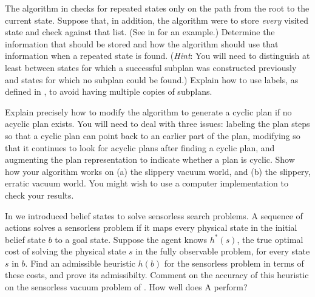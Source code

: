 
\begin{exercise}
The  algorithm in
 checks for repeated states only
on the path from the root to the current state.
Suppose that, in addition, the algorithm were to store {\em every}
visited state and check against that list. (See  in
 for an example.) Determine the
information that should be stored and how the algorithm should use
that information when a repeated state is found. ({\em Hint}: You will
need to distinguish at least between states for which a successful
subplan was constructed previously and states for which no subplan
could be found.) Explain how to use labels, as defined in , to avoid having multiple copies of subplans.
\end{exercise} 

\begin{exercise}\prgex
Explain precisely how to modify the  algorithm
to generate a cyclic plan if no acyclic plan exists. You will need to deal
with three issues: labeling the plan steps so that a cyclic
plan can point back to an earlier part of the plan, modifying
 so that it continues to look for acyclic plans after
finding a cyclic plan, and augmenting the plan representation to
indicate whether  a plan is cyclic. Show how your algorithm
works on (a) the slippery vacuum world, and (b) 
the slippery, erratic vacuum world. You might wish to use a
computer implementation to check your results.
\end{exercise} 



\begin{exercise}%
In  we introduced belief states to solve sensorless search
problems.  A sequence of actions solves a sensorless problem if it maps
every physical state in the initial belief state \(b\) to a goal state.  Suppose the agent knows \(h^*(s)\), the true optimal cost of solving the physical state \(s\) in the fully observable problem, for every state \(s\) in \(b\).
Find an admissible heuristic \(h(b)\) for the sensorless problem in terms of these costs, and prove its admissibilty.
Comment on the accuracy of this heuristic on the
sensorless vacuum problem of .  How well does A{\star}
perform?
\end{exercise} 

